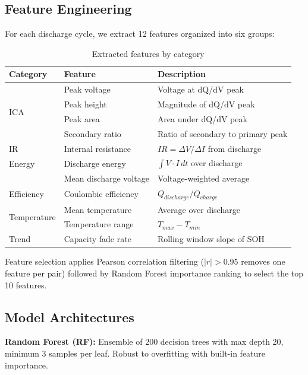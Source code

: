 \documentclass[11pt,a4paper]{article}
\begin{document}
\subsection{Feature Engineering}

For each discharge cycle, we extract 12 features organized into six groups:

\begin{table}[H]
\centering
\caption{Extracted features by category}
\label{tab:features}
\begin{tabular}{lll}
\toprule
\textbf{Category} & \textbf{Feature} & \textbf{Description} \\
\midrule
\multirow{4}{*}{ICA} & Peak voltage & Voltage at dQ/dV peak \\
& Peak height & Magnitude of dQ/dV peak \\
& Peak area & Area under dQ/dV peak \\
& Secondary ratio & Ratio of secondary to primary peak \\
\midrule
\multirow{1}{*}{IR} & Internal resistance & $IR = \Delta V / \Delta I$ from discharge \\
\midrule
Energy & Discharge energy & $\int V \cdot I \, dt$ over discharge \\
& Mean discharge voltage & Voltage-weighted average \\
\midrule
Efficiency & Coulombic efficiency & $Q_{discharge} / Q_{charge}$ \\
\midrule
\multirow{2}{*}{Temperature} & Mean temperature & Average over discharge \\
& Temperature range & $T_{max} - T_{min}$ \\
\midrule
Trend & Capacity fade rate & Rolling window slope of SOH \\
\bottomrule
\end{tabular}
\end{table}

Feature selection applies Pearson correlation filtering ($|r| > 0.95$ removes one feature per pair) followed by Random Forest importance ranking to select the top 10 features.

\subsection{Model Architectures}

\textbf{Random Forest (RF):} Ensemble of 200 decision trees with max depth 20, minimum 3 samples per leaf. Robust to overfitting with built-in feature importance.
\end{document}
